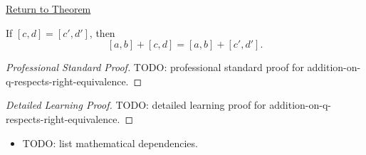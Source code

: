 \newpage
{}
\label{prf:addition-on-q-respects-right-equivalence}

\begin{remark*}[Return]
\hyperref[lem:addition-on-q-respects-right-equivalence]{Return to Theorem}
\end{remark*}

\begin{lemma*}
If $[c,d]=[c',d']$, then
\[
[a,b]+[c,d]=[a,b]+[c',d'].
\]
\end{lemma*}

\begin{proof}[Professional Standard Proof]
\LRAProofBodyStart
TODO: professional standard proof for addition-on-q-respects-right-equivalence.
\end{proof}

\begin{proof}[Detailed Learning Proof]
\LRAProofBodyStart
TODO: detailed learning proof for addition-on-q-respects-right-equivalence.
\end{proof}

\begin{remark*}
\end{remark*}

\begin{dependencies}
\begin{itemize}
  \item TODO: list mathematical dependencies.
\end{itemize}
\end{dependencies}

\clearpage
